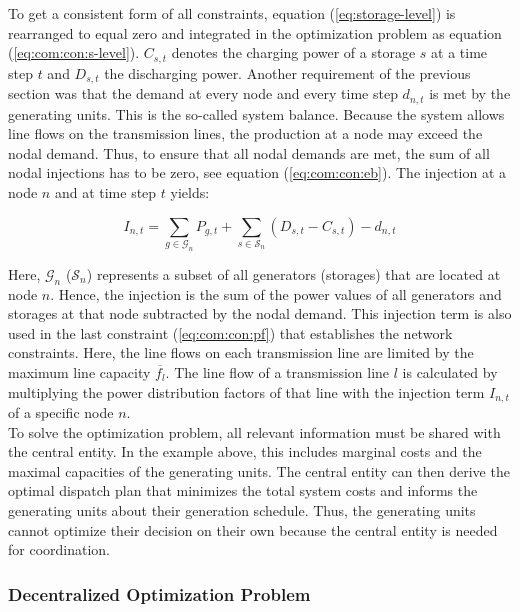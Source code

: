 To get a consistent form of all constraints, equation (\ref{eq:storage-level}) is rearranged to equal zero and integrated in the optimization problem as equation (\ref{eq:com:con:s-level}). $C_{s,t}$ denotes the charging power of a storage $s$ at a time step $t$ and $D_{s,t}$ the discharging power. Another requirement of the previous section was that the demand at every node and every time step $d_{n,t}$ is met by the generating units. This is the so-called system balance. Because the system allows line flows on the transmission lines, the production at a node may exceed the nodal demand. Thus, to ensure that all nodal demands are met, the sum of all nodal injections has to be zero, see equation (\ref{eq:com:con:eb}). The injection at a node $n$ and at time step $t$ yields:

\begin{equation}
	I_{n,t} = \sum_{g\in\mathcal{G}_n}P_{g,t} + \sum_{s\in\mathcal{S}_n}(D_{s,t}-C_{s,t})-d_{n,t}
	\label{eq:injection-term}
\end{equation}

Here, $\mathcal{G}_n$ ($\mathcal{S}_n$) represents a subset of all generators (storages) that are located at node $n$. Hence, the injection is the sum of the power values of all generators and storages at that node subtracted by the nodal demand. This injection term is also used in the last constraint (\ref{eq:com:con:pf}) that establishes the network constraints. Here, the line flows on each transmission line are limited by the maximum line capacity $\overline{f_l}$. The line flow of a transmission line $l$ is calculated by multiplying the power distribution factors of that line with the injection term $I_{n,t}$ of a specific node $n$.\\
	
To solve the optimization problem, all relevant information must be shared with the central entity. In the example above, this includes marginal costs and the maximal capacities of the generating units. The central entity can then derive the optimal dispatch plan that minimizes the total system costs and informs the generating units about their generation schedule. Thus, the generating units cannot optimize their decision on their own because the central entity is needed for coordination.	

\subsubsection{Decentralized Optimization Problem}
\label{sec:app:dom}

